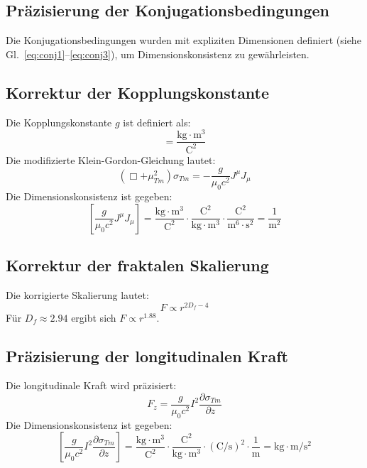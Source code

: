 \documentclass[10pt, a4paper]{article}
\begin{document}
	\subsection{Präzisierung der Konjugationsbedingungen}
	Die Konjugationsbedingungen wurden mit expliziten Dimensionen definiert (siehe Gl.~\ref{eq:conj1}–\ref{eq:conj3}), um Dimensionskonsistenz zu gewährleisten.
	
	\subsection{Korrektur der Kopplungskonstante}
	Die Kopplungskonstante $g$ ist definiert als:
	\begin{equation}
		[g] = \frac{\text{kg} \cdot \text{m}^3}{\text{C}^2}
	\end{equation}
	Die modifizierte Klein-Gordon-Gleichung lautet:
	\begin{equation}
		(\Box + \mu_{Tm}^2) \sigma_{Tm} = -\frac{g}{\mu_0 c^2} J^\mu J_\mu \label{eq:sigma_eq_final}
	\end{equation}
	Die Dimensionskonsistenz ist gegeben:
	\begin{equation}
		\left[\frac{g}{\mu_0 c^2} J^\mu J_\mu\right] = \frac{\text{kg} \cdot \text{m}^3}{\text{C}^2} \cdot \frac{\text{C}^2}{\text{kg} \cdot \text{m}^3} \cdot \frac{\text{C}^2}{\text{m}^6 \cdot \text{s}^2} = \frac{1}{\text{m}^2}
	\end{equation}
	
	\subsection{Korrektur der fraktalen Skalierung}
	Die korrigierte Skalierung lautet:
	\begin{equation}
		F \propto r^{2D_f - 4} \label{eq:fractal_scaling_final}
	\end{equation}
	Für $D_f \approx 2.94$ ergibt sich $F \propto r^{1.88}$.
	
	\subsection{Präzisierung der longitudinalen Kraft}
	Die longitudinale Kraft wird präzisiert:
	\begin{equation}
		F_z = \frac{g}{\mu_0 c^2} I^2 \frac{\partial \sigma_{Tm}}{\partial z} \label{eq:long_force_final}
	\end{equation}
	Die Dimensionskonsistenz ist gegeben:
	\begin{equation}
		\left[\frac{g}{\mu_0 c^2} I^2 \frac{\partial \sigma_{Tm}}{\partial z}\right] = \frac{\text{kg} \cdot \text{m}^3}{\text{C}^2} \cdot \frac{\text{C}^2}{\text{kg} \cdot \text{m}^3} \cdot (\text{C}/\text{s})^2 \cdot \frac{1}{\text{m}} = \text{kg} \cdot \text{m}/\text{s}^2
	\end{equation}
	
\end{document}
